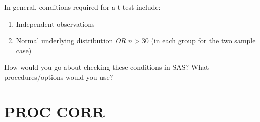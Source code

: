 

\begin{frame}
In general, conditions required for a t-test include:
\begin{enumerate}
\item Independent observations
\item Normal underlying distribution \emph{OR} $n>30$ (in each group for the two sample case)
\end{enumerate}
\vskip10pt
\oyo How would you go about checking these conditions in SAS?  What procedures/options would you use?
\end{frame}



\section[PROC CORR]{PROC CORR}
\subsection{}
\begin{frame}
\end{frame}

